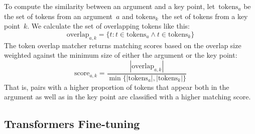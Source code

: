 To compute the similarity between an argument and a key point, let~\(\text{tokens}_a\) be the set of tokens from an argument~\(a\) and \(\text{tokens}_k\)~the set of tokens from a key point~\(k\).
We calculate the set of overlapping tokens like this:
\begin{equation}
    \text{overlap}_{a,k} = \{ t : t \in \text{tokens}_a \land t \in \text{tokens}_k \}
\end{equation}
The token overlap matcher returns matching scores based on the overlap size weighted against the minimum size of either the argument or the key point:
\begin{equation}
    \text{score}_{a,k} = \frac{ |\text{overlap}_{a,k}| }{ \min\{ |\text{tokens}_a|, |\text{tokens}_k| \} }
\end{equation}
That is, pairs with a higher proportion of tokens that appear both in the argument as well as in the key point are classified with a higher matching score.

\subsection{Transformers Fine-tuning}

